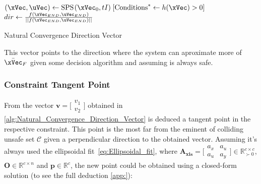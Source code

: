 

  \begin{algorithm}
    $(\xVec, \uVec) \gets \text{SPS}\hspace{0.1em}(\xVec_0, tI) \hspace{0.25em} [\text{Conditions}^* \gets h(\xVec) > 0]$  
    $dir \gets \frac{f(\xVec_{END}, \uVec_{END})}{||f(\xVec_{END}, \uVec_{END})||}$ 
    \caption{Natural Convergence Direction Vector} \label{alg:Natural_Convergence_Direction_Vector}
  \end{algorithm}

  This vector points to the direction where the system can aproximate more of \(\bar{\xVec}_F\) given some decision algorithm and assuming is always safe.


\subsubsection{Constraint Tangent Point}
\label{subsubsec:Constraint_Tangent_Point}

From the vector \(\mathbf{v} = \bigl[\begin{smallmatrix} v_1\\ v_2 \end{smallmatrix} \bigr]\) obtained in \ref{alg:Natural_Convergence_Direction_Vector} is deduced a tangent point in the respective constraint. This point is the most far from the eminent of colliding unsafe set \(\mathcal{C}\) given a perpendicular direction to the obtained vector.%
 Assuming it's always used the ellipsoidal fit~\ref{eq:Ellipsoidal_fit}, where \(\mathbf{A_{xis}} = \bigl[\begin{smallmatrix} a_x&a_u \\ a_u&a_y \end{smallmatrix} \bigr] \in \mathbb{R}^{c \times c}_{\succ 0}\), \(\mathbf{O} \in \mathbb{R}^{c \times n}\) and \(\mathbf{p} \in \mathbb{R}^{c}\), the new point could be obtained using a closed-form solution (to see the full deduction \ref{app:}):


